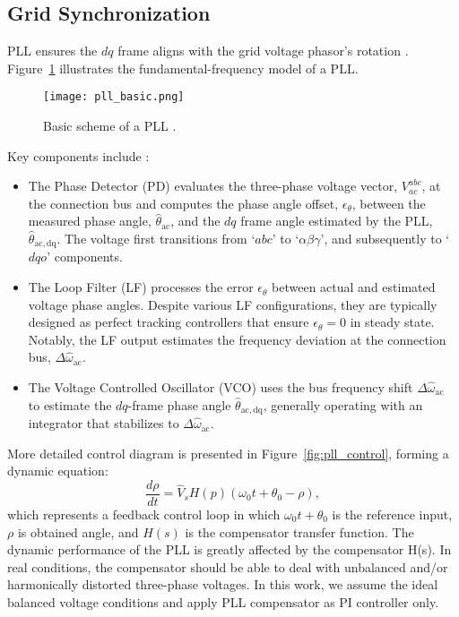 \subsection{Grid Synchronization}\label{subsec:ch3/sec2/sub3}
PLL ensures the $dq$ frame aligns with the grid voltage phasor's rotation \autocite{cole2010vsc, 5637778}. Figure~\cref{fig:pll_basic} illustrates the fundamental-frequency model of a PLL. 

\begin{figure}[htbp]
    \centering
    \texttt{[image: pll\_basic.png]}
    \caption{Basic scheme of a PLL \autocite{Milano_2019_ess}.}
    \label{fig:pll_basic}
\end{figure}
Key components include \autocite{Milano_2019_ess}:
\begin{itemize}
    \item The Phase Detector (PD) evaluates the three-phase voltage vector, $V_{ac}^{abc}$, at the connection bus and computes the phase angle offset, $\epsilon_\theta$, between the measured phase angle, $\hat{\theta}_\mathrm{ac}$, and the $dq$ frame angle estimated by the PLL, $\hat{\theta}_{\mathrm{ac}, \mathrm{dq}}$. The voltage first transitions from ‘$abc$’ to ‘$\alpha\beta\gamma$’, and subsequently to ‘$dqo$’ components.
     \item The Loop Filter (LF) processes the error $\epsilon_\theta$ between actual and estimated voltage phase angles. Despite various LF configurations, they are typically designed as perfect tracking controllers that ensure $\epsilon_\theta = 0$ in steady state. Notably, the LF output estimates the frequency deviation at the connection bus, $\Delta \hat{\omega}_{\mathrm{ac}}$.
     \item The Voltage Controlled Oscillator (VCO) uses the bus frequency shift $\Delta \hat{\omega}_{\mathrm{ac}}$ to estimate the $dq$-frame phase angle $\hat{\theta}_{\mathrm{ac}, \mathrm{dq}}$, generally operating with an integrator that stabilizes to $\Delta \hat{\omega}_{\mathrm{ac}}$.
\end{itemize}

More detailed control diagram is presented in Figure~\cref{fig:pll_control}, forming a dynamic equation: 
\begin{equation}
     \frac{d\rho}{dt} = \hat{V}_{s} H(p) (\omega_{0} t + \theta_{0} - \rho),
\end{equation}
\noindent which represents a feedback control loop in which $\omega_{0} t + \theta_{0}$ is the reference input, $\rho$ is obtained angle, and $H(s)$ is the compensator transfer function. The dynamic performance of the PLL is greatly affected by the compensator H(s). In real conditions, the compensator should be able to deal with unbalanced and/or harmonically distorted three-phase voltages. In this work, we assume the ideal balanced voltage conditions and apply PLL compensator as PI controller only.

